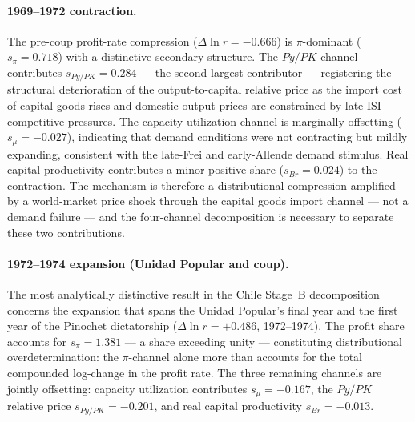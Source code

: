 \documentclass[11pt,a4paper]{article}
\begin{document}
{\paragraph{1969--1972 contraction.}

The pre-coup profit-rate compression ($\Delta\ln r = -0.666$) is
$\pi$-dominant ($s_\pi = 0.718$) with a distinctive secondary structure.
The $Py/PK$ channel contributes $s_{Py/PK} = 0.284$ --- the second-largest
contributor --- registering the structural deterioration of the
output-to-capital relative price as the import cost of capital goods rises
and domestic output prices are constrained by late-ISI competitive pressures.
The capacity utilization channel is marginally offsetting ($s_\mu = -0.027$),
indicating that demand conditions were not contracting but mildly expanding,
consistent with the late-Frei and early-Allende demand stimulus. Real
capital productivity contributes a minor positive share ($s_{Br} = 0.024$)
to the contraction. The mechanism is therefore a distributional compression
amplified by a world-market price shock through the capital goods import
channel --- not a demand failure --- and the four-channel decomposition is
necessary to separate these two contributions.

\paragraph{1972--1974 expansion (Unidad Popular and coup).}

The most analytically distinctive result in the Chile Stage~B decomposition
concerns the expansion that spans the Unidad Popular's final year and the
first year of the Pinochet dictatorship ($\Delta\ln r = +0.486$,
1972--1974). The profit share accounts for $s_\pi = 1.381$ --- a share
exceeding unity --- constituting distributional overdetermination: the
$\pi$-channel alone more than accounts for the total compounded log-change
in the profit rate. The three remaining channels are jointly offsetting:
capacity utilization contributes $s_\mu = -0.167$, the $Py/PK$ relative
price $s_{Py/PK} = -0.201$, and real capital productivity $s_{Br} = -0.013$.

}
\end{document}
